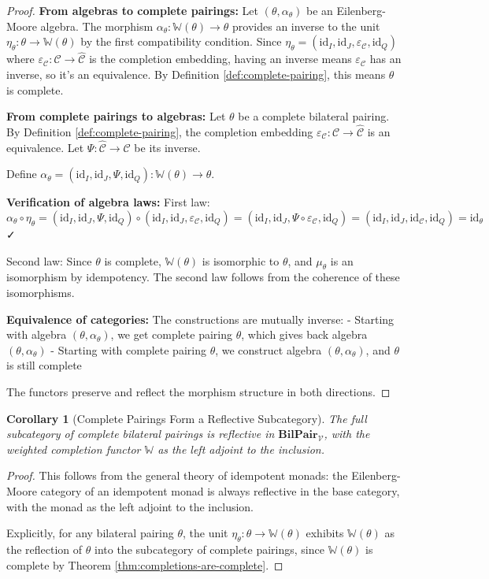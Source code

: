 \documentclass[11pt]{article}
\theoremstyle{plain}
\newtheorem{corollary}[theorem]{Corollary}
\theoremstyle{definition}
\theoremstyle{remark}
\newcommand{\V}{\mathcal{V}}
\newcommand{\C}{\mathcal{C}}
\newcommand{\id}{\mathrm{id}}
\newcommand{\wh}[1]{\widehat{#1}}
\begin{document}
\begin{proof}
\textbf{From algebras to complete pairings:}
Let $(θ, α_θ)$ be an Eilenberg-Moore algebra. The morphism $α_θ : \mathbb{W}(θ) → θ$ provides an inverse to the unit $η_θ : θ → \mathbb{W}(θ)$ by the first compatibility condition. Since $η_θ = (\id_I, \id_J, \varepsilon_\C, \id_Q)$ where $\varepsilon_\C : \C → \wh{\C}$ is the completion embedding, having an inverse means $\varepsilon_\C$ has an inverse, so it's an equivalence. By Definition \ref{def:complete-pairing}, this means $θ$ is complete.

\textbf{From complete pairings to algebras:}
Let $θ$ be a complete bilateral pairing. By Definition \ref{def:complete-pairing}, the completion embedding $\varepsilon_\C : \C → \wh{\C}$ is an equivalence. Let $\Psi : \wh{\C} → \C$ be its inverse.

Define $α_θ = (\id_I, \id_J, Ψ, \id_Q) : \mathbb{W}(θ) → θ$.

\textbf{Verification of algebra laws:}
First law: $α_θ \circ η_θ = (\id_I, \id_J, Ψ, \id_Q) \circ (\id_I, \id_J, \varepsilon_\C, \id_Q) = (\id_I, \id_J, Ψ \circ \varepsilon_\C, \id_Q) = (\id_I, \id_J, \id_\C, \id_Q) = \id_θ$ ✓

Second law: Since $θ$ is complete, $\mathbb{W}(θ)$ is isomorphic to $θ$, and $\mu_θ$ is an isomorphism by idempotency. The second law follows from the coherence of these isomorphisms.

\textbf{Equivalence of categories:}
The constructions are mutually inverse:
- Starting with algebra $(θ, α_θ)$, we get complete pairing $θ$, which gives back algebra $(θ, α_θ)$
- Starting with complete pairing $θ$, we construct algebra $(θ, α_θ)$, and $θ$ is still complete

The functors preserve and reflect the morphism structure in both directions.
\end{proof}

\begin{corollary}[Complete Pairings Form a Reflective Subcategory]\label{cor:reflective-subcategory}
The full subcategory of complete bilateral pairings is reflective in $\mathbf{BilPair}_\V$, with the weighted completion functor $\mathbb{W}$ as the left adjoint to the inclusion.
\end{corollary}

\begin{proof}
This follows from the general theory of idempotent monads: the Eilenberg-Moore category of an idempotent monad is always reflective in the base category, with the monad as the left adjoint to the inclusion.

Explicitly, for any bilateral pairing $θ$, the unit $η_θ : θ → \mathbb{W}(θ)$ exhibits $\mathbb{W}(θ)$ as the reflection of $θ$ into the subcategory of complete pairings, since $\mathbb{W}(θ)$ is complete by Theorem \ref{thm:completions-are-complete}.
\end{proof}
\end{document}
